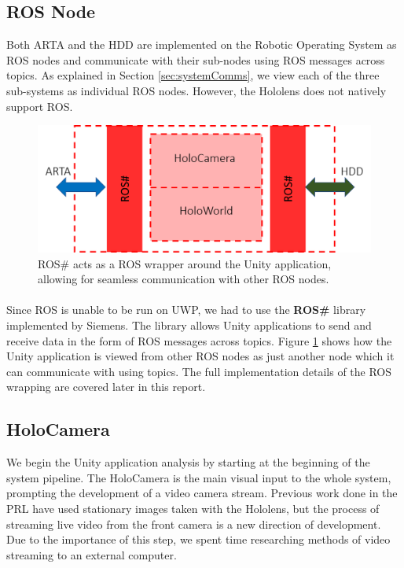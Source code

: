 \subsection{ROS Node} \label{sec:rossharp}
Both ARTA and the HDD are implemented on the Robotic Operating System as ROS nodes and communicate with their sub-nodes using ROS messages across topics. As explained in Section \ref{sec:systemComms}, we view each of the three sub-systems as individual ROS nodes. However, the Hololens does not natively support ROS.

\begin{figure}[ht!]
    \centering
    \includegraphics[width=0.8\linewidth]{img/chapter4_analysis/holoROSSharpWrapper.png}
    \caption{ROS\# acts as a ROS wrapper around the Unity application, allowing for seamless communication with other ROS nodes.}
    \label{fig:holoROSWrapper}
    \vspace{-1\baselineskip}
\end{figure}

\paragraph{} Since ROS is unable to be run on UWP, we had to use the \textbf{ROS\#} library implemented by Siemens. The library allows Unity applications to send and receive data in the form of ROS messages across topics. Figure \ref{fig:holoROSWrapper} shows how the Unity application is viewed from other ROS nodes as just another node which it can communicate with using topics. The full implementation details of the ROS wrapping are covered later in this report. 

\subsection{HoloCamera}
We begin the Unity application analysis by starting at the beginning of the system pipeline. The HoloCamera is the main visual input to the whole system, prompting the development of a video camera stream. Previous work done in the PRL have used stationary images taken with the Hololens, but the process of streaming live video from the front camera is a new direction of development. Due to the importance of this step, we spent time researching methods of video streaming to an external computer.

